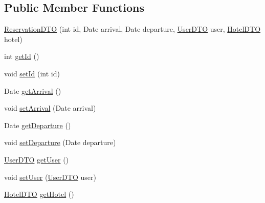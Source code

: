 \subsection*{Public Member Functions}
\begin{DoxyCompactItemize}
\item 
\mbox{\hyperlink{classbspq18__e4_1_1_gestion_hotelera_1_1server_1_1dto_1_1_reservation_d_t_o_aebeec3ade8cb634be38e808eef8bc257}{Reservation\+D\+TO}} (int id, Date arrival, Date departure, \mbox{\hyperlink{classbspq18__e4_1_1_gestion_hotelera_1_1server_1_1dto_1_1_user_d_t_o}{User\+D\+TO}} user, \mbox{\hyperlink{classbspq18__e4_1_1_gestion_hotelera_1_1server_1_1dto_1_1_hotel_d_t_o}{Hotel\+D\+TO}} hotel)
\item 
int \mbox{\hyperlink{classbspq18__e4_1_1_gestion_hotelera_1_1server_1_1dto_1_1_reservation_d_t_o_a2093326909f66747c279b74505d5e405}{get\+Id}} ()
\item 
void \mbox{\hyperlink{classbspq18__e4_1_1_gestion_hotelera_1_1server_1_1dto_1_1_reservation_d_t_o_adc9edf8b8fbda78039f061648a6a273e}{set\+Id}} (int id)
\item 
Date \mbox{\hyperlink{classbspq18__e4_1_1_gestion_hotelera_1_1server_1_1dto_1_1_reservation_d_t_o_aaf257e46f13b345653fb4e7c40ad29f9}{get\+Arrival}} ()
\item 
void \mbox{\hyperlink{classbspq18__e4_1_1_gestion_hotelera_1_1server_1_1dto_1_1_reservation_d_t_o_ace3973bba85acd0a6bf307bdfe141ddf}{set\+Arrival}} (Date arrival)
\item 
Date \mbox{\hyperlink{classbspq18__e4_1_1_gestion_hotelera_1_1server_1_1dto_1_1_reservation_d_t_o_a90e75d51d2cdf60dc16727ddae889aac}{get\+Departure}} ()
\item 
void \mbox{\hyperlink{classbspq18__e4_1_1_gestion_hotelera_1_1server_1_1dto_1_1_reservation_d_t_o_aae10bf99f78a01d58b0d4f118318365a}{set\+Departure}} (Date departure)
\item 
\mbox{\hyperlink{classbspq18__e4_1_1_gestion_hotelera_1_1server_1_1dto_1_1_user_d_t_o}{User\+D\+TO}} \mbox{\hyperlink{classbspq18__e4_1_1_gestion_hotelera_1_1server_1_1dto_1_1_reservation_d_t_o_a16e976b8c5d6fa449a9e1716d06b17ed}{get\+User}} ()
\item 
void \mbox{\hyperlink{classbspq18__e4_1_1_gestion_hotelera_1_1server_1_1dto_1_1_reservation_d_t_o_a48432135cea148c025244ff0f5cd41b3}{set\+User}} (\mbox{\hyperlink{classbspq18__e4_1_1_gestion_hotelera_1_1server_1_1dto_1_1_user_d_t_o}{User\+D\+TO}} user)
\item 
\mbox{\hyperlink{classbspq18__e4_1_1_gestion_hotelera_1_1server_1_1dto_1_1_hotel_d_t_o}{Hotel\+D\+TO}} \mbox{\hyperlink{classbspq18__e4_1_1_gestion_hotelera_1_1server_1_1dto_1_1_reservation_d_t_o_addeb03ed7d35403d43c27fb3b177579d}{get\+Hotel}} ()

\end{DoxyCompactItemize}
